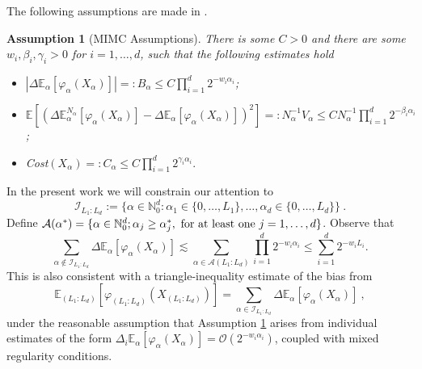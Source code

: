 \documentclass[english]{article}
\newtheorem{ass}{Assumption}[section]
\newcommand{\bbE}{\mathbb{E}}
\newcommand{\cO}{\mathcal{O}}
\begin{document}
The following assumptions are made in \cite{mimc}.
\begin{ass}[MIMC Assumptions]
\label{ass:mimc1} 
There is some $C>0$ and there are some $w_i, \beta_i, \gamma_i >0$ 
for $i=1,\dots, d$, such that the following estimates hold
\begin{itemize}
\item[{\rm (a)}] $\left|\Delta \mathbb{E}_{\alpha}[\varphi_{\alpha}(X_{\alpha})]\right| 
=: B_\alpha \leq C \prod_{i=1}^d 2^{-w_i\alpha_i}$;
\item[{\rm (b)}] $\bbE\left [ \left ( 
\Delta \mathbb{E}^{N_\alpha}_{\alpha}[\varphi_{\alpha}(X_{\alpha})] 
- \Delta \mathbb{E}_{\alpha}[\varphi_{\alpha}(X_{\alpha})]\right )^2 \right ] 
=: N_\alpha^{-1}V_\alpha \leq C N_\alpha^{-1}\prod_{i=1}^d 2^{-\beta_i\alpha_i}$;
\item[{\rm (c)}] {\rm Cost}$(X_{\alpha}) =: C_\alpha \leq C \prod_{i=1}^d 2^{\gamma_i \alpha_i}.$
\end{itemize}
\end{ass}



In the present work we will constrain our attention to
\begin{equation}\label{eq:tp}
\mathcal{I}_{ L_1:L_d}  := \{\alpha\in\mathbb{N}_0^d:\alpha_1\in\{0,\dots,L_1\},\dots,\alpha_d\in\{0,\dots,L_d\}\} \ . 
\end{equation}
\noindent
Define $\mathcal{A}(\alpha^*) = \{\alpha\in  \mathbb{N}_0^d ; \alpha_j \geq \alpha^*_j,~ {\rm for~at~least~one}~ j =1,\dots, d\}$.
Observe that 
\begin{equation}\label{eq:biassum}
\sum_{\alpha\notin\mathcal{I}_{ L_1:L_d}} 
\Delta \mathbb{E}_{\alpha}[\varphi_{\alpha}(X_{\alpha})]
\lesssim 
\sum_{\alpha \in \mathcal{A}(L_1:L_d)} \prod_{i=1}^d 2^{-w_i\alpha_i}
\le  \sum_{i=1}^d 2^{-w_iL_i}. 
\end{equation}
This is also consistent with a triangle-inequality estimate
of the bias from 
$$
\mathbb{E}_{(L_1:L_d)}[\varphi_{(L_1:L_d)}(X_{(L_1:L_d)})] 
= \sum_{\alpha\in\mathcal{I}_{ L_1:L_d}} 
\Delta \mathbb{E}_{\alpha}[\varphi_{\alpha}(X_{\alpha})] \ ,
$$
under the reasonable assumption that Assumption \ref{ass:mimc1}
arises from individual estimates of the form
$\Delta_i \mathbb{E}_{\alpha}[\varphi_{\alpha}(X_{\alpha})] = \cO(2^{-w_i\alpha_i})$,
coupled with mixed regularity conditions.
\end{document}
